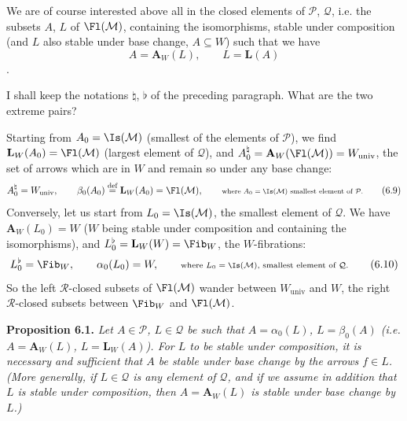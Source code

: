 We are of course interested above all in the closed elements of $\mathcal{P}$, $\mathcal{Q}$, i.e. the subsets $A$, $L$ of $\Fl(\mathcal{M})$, containing the isomorphisms, stable under composition (and $L$ also stable under base change, $A \subseteq W$) such that we have
\[
A = \mathbf{A}_W(L), \qquad L = \mathbf{L}(A) \tag*{(6.8)}
\]
.


I shall keep the notations $\natural$, $\flat$ of the preceding paragraph. What are the two extreme pairs?

Starting from $A_0 = \Is(\mathcal{M})$ (smallest of the elements of $\mathcal{P}$), we find $\mathbf{L}_W(A_0) = \Fl(\mathcal{M})$ (largest element of $\mathcal{Q}$), and $A_0^{\natural} = \mathbf{A}_W(\Fl(\mathcal{M})) = W_{\mathrm{univ}}$, the set of arrows which are in $W$ and remain so under any base change:
\[
A_0^{\natural} = W_{\mathrm{univ}}, \qquad \beta_0(A_0) \overset{\text{def}}{=} \mathbf{L}_W(A_0) = \Fl(\mathcal{M}), \qquad \text{\scriptsize where $A_0 = \Is(\mathcal{M})$ smallest element of $\mathcal{P}$.} \tag*{(6.9)}
\]
Conversely, let us start from $L_0 = \Is(\mathcal{M})$, the smallest element of $\mathcal{Q}$. We have $\mathbf{A}_W(L_0) = W$ ($W$ being stable under composition and containing the isomorphisms), and $L_0^{\flat} = \mathbf{L}_W(W) = \Fib_W$, the $W$-fibrations:
\[
L_0^{\flat} = \Fib_W, \qquad \alpha_0(L_0) = W, \qquad \text{\scriptsize where $L_0 = \Is(\mathcal{M})$, smallest element of $\mathcal{Q}$.} \tag*{(6.10)}
\]
So the left $\mathcal{R}$-closed subsets of $\Fl(\mathcal{M})$ wander between $W_{\mathrm{univ}}$ and $W$, the right $\mathcal{R}$-closed subsets between $\Fib_W$ and $\Fl(\mathcal{M})$.

\textbf{Proposition 6.1.} \textit{Let $A \in \mathcal{P}$, $L \in \mathcal{Q}$ be such that $A = \alpha_0(L)$, $L = \beta_0(A)$ (i.e. $A = \mathbf{A}_W(L)$, $L = \mathbf{L}_W(A)$). For $L$ to be stable under composition, it is necessary and sufficient that $A$ be stable under base change by the arrows $f \in L$. (More generally, if $L \in \mathcal{Q}$ is any element of $\mathcal{Q}$, and if we assume in}  \textit{addition that $L$ is stable under composition, then $A = \mathbf{A}_W(L)$ is stable under base change by $L$.)}

